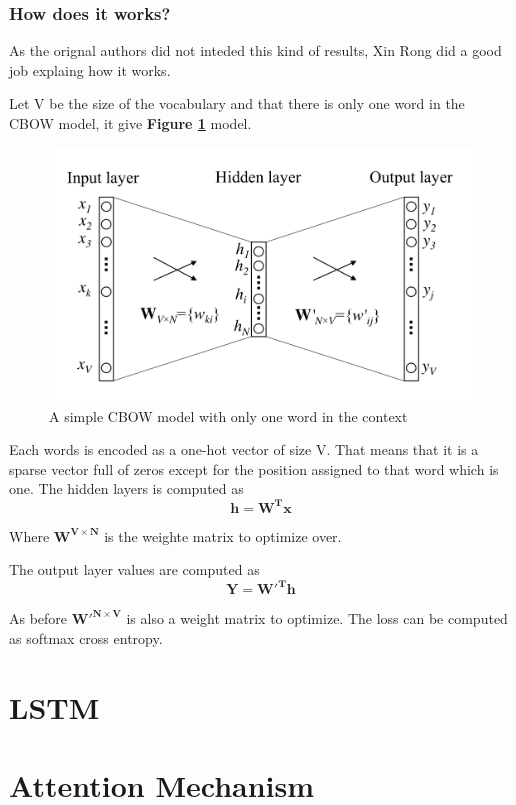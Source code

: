 \subsubsection{How does it works?} 
As the orignal authors did not inteded this kind of results, Xin Rong\cite{Rong2014} did a good job explaing how it works. 

Let V be the size of the vocabulary and that there is only one word in the CBOW model, it give \textbf{Figure \ref{fig:chap4:CBOW}} model. 

\begin{figure}
	\centering
	\includegraphics[width=\textwidth]{images/chapitre4/CBOW}
	\caption{A simple CBOW model with only one word in the context}
	\label{fig:chap4:CBOW}
\end{figure}

Each words is encoded as a one-hot vector of size V. That means that it is a sparse vector full of zeros except for the position assigned to that word which is one. The hidden layers is computed as 
\begin{equation}
	\mathbf{h} = \mathbf{W^Tx}
\end{equation}

Where $\mathbf{W^{V \times N}}$ is the weighte matrix to optimize over. 

The output layer values are computed as 
\begin{equation}
	\mathbf{Y} = \mathbf{W'^Th}
\end{equation}

As before $\mathbf{W'^{N \times V}}$ is also a weight matrix to optimize. The loss can be computed as softmax cross entropy. 

\section{LSTM}
\section{Attention Mechanism}